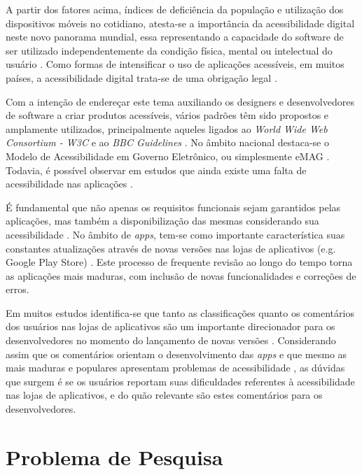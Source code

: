 \documentclass[
	12pt,				%
	oneside,			%
	a4paper,			%
	english,			%
	brazil				%
	]{abntex2ppgsi}
\begin{document}
A partir dos fatores acima, índices de deficiência da população e utilização dos dispositivos móveis no cotidiano, atesta-se a importância da acessibilidade digital neste novo panorama mundial, essa representando a capacidade do software de ser utilizado independentemente da condição física, mental ou intelectual do usuário \cite{w3cwai}. Como formas de intensificar o uso de aplicações acessíveis, em muitos países, a acessibilidade digital trata-se de uma obrigação legal \cite{Silva2018survey}. 

Com a intenção de endereçar este tema auxiliando os designers e desenvolvedores de software a criar produtos acessíveis, vários padrões têm sido propostos e amplamente utilizados, principalmente aqueles ligados ao \textit{World Wide Web Consortium - W3C} \cite{wcag} e ao \textit{BBC Guidelines} \cite{bbc}. No âmbito nacional destaca-se o Modelo de Acessibilidade em Governo Eletrônico, ou simplesmente eMAG \cite{emag}. Todavia, é possível observar em estudos que ainda existe uma falta de acessibilidade nas aplicações \cite{smartcities,Eler2018mate,Quispe2018accessibility,Serra2015accessibility,Yan2019currentstatus}.

É fundamental que não apenas os requisitos funcionais sejam garantidos pelas aplicações, mas também a disponibilização das mesmas considerando sua acessibilidade \cite{Oliveira2017strategies}. No âmbito de \textit{apps}, tem-se como importante característica suas constantes atualizações através de novas versões nas lojas de aplicativos (e.g. Google Play Store) \cite{nayebi,Palompa2018crowdsourcing}. Este processo de frequente revisão ao longo do tempo torna as aplicações mais maduras, com inclusão de novas funcionalidades e correções de erros.

Em muitos estudos identifica-se que tanto as classificações quanto os comentários dos usuários nas lojas de aplicativos são um importante direcionador para os desenvolvedores no momento do lançamento de novas versões \cite{Ciurumelea2017analyzing,Li2018MobileAE,Ortega2015thesis,Palomba2015userreviews,Palompa2018crowdsourcing,Pelloni2018becloma}. Considerando assim que os comentários orientam o desenvolvimento das \textit{apps} e que mesmo as mais maduras e populares apresentam problemas de acessibilidade \cite{Eler2018mate}, as dúvidas que surgem é se os usuários reportam suas dificuldades referentes à acessibilidade nas lojas de aplicativos, e do quão relevante são estes comentários para os desenvolvedores.



\section{Problema de Pesquisa}
\end{document}
